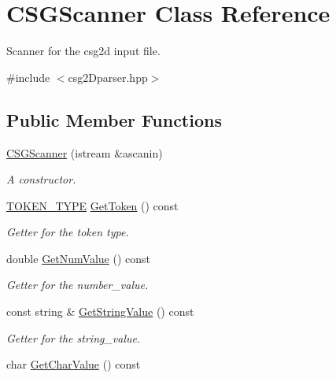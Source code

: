 \hypertarget{class_c_s_g_scanner}{
\section{CSGScanner Class Reference}
\label{class_c_s_g_scanner}
}


Scanner for the csg2d input file.  




{\ttfamily \#include $<$csg2Dparser.hpp$>$}

\subsection*{Public Member Functions}
\begin{DoxyCompactItemize}
\item 
\hyperlink{class_c_s_g_scanner_a81a3ad42eb3274583fcc87f31b343ce8}{CSGScanner} (istream \&ascanin)
\begin{DoxyCompactList}\small\item\em A constructor. \item\end{DoxyCompactList}\item 
\hyperlink{csg2_dparser_8hpp_abbf72a04a030b0407c2a0d547f84e12d}{TOKEN\_\-TYPE} \hyperlink{class_c_s_g_scanner_ac0039567197944ff073e82bb11efe900}{GetToken} () const 
\begin{DoxyCompactList}\small\item\em Getter for the token type. \item\end{DoxyCompactList}\item 
double \hyperlink{class_c_s_g_scanner_aeef8b65af04e9b57d662fa4c430d3f8a}{GetNumValue} () const 
\begin{DoxyCompactList}\small\item\em Getter for the number\_\-value. \item\end{DoxyCompactList}\item 
const string \& \hyperlink{class_c_s_g_scanner_afcbcdd18954112e8c0440d8320688208}{GetStringValue} () const 
\begin{DoxyCompactList}\small\item\em Getter for the string\_\-value. \item\end{DoxyCompactList}\item 
char \hyperlink{class_c_s_g_scanner_afbae7d06ab56034c88ccce81ef9462a3}{GetCharValue} () const 

\end{DoxyCompactItemize}
